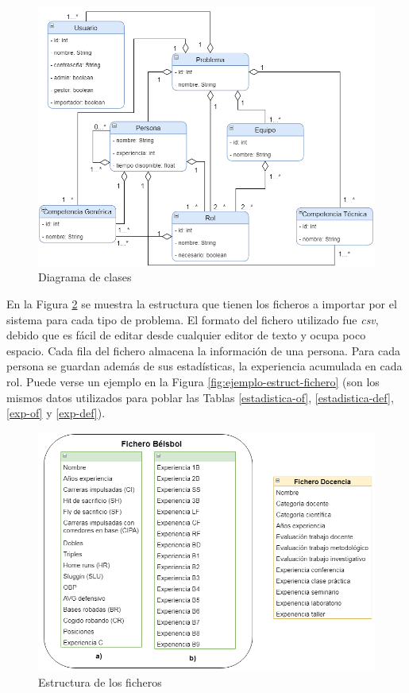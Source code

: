 \begin{figure}[H]
	\centering
	\includegraphics[width=1\textwidth]{figuras/diagramaClases.png}
	\caption{Diagrama de clases}\label{fig:diag-clases}
\end{figure}

En la Figura \ref{fig:estruct-fichero} se muestra la estructura que tienen los ficheros a importar por el sistema para cada tipo de problema. El formato del fichero utilizado fue \textit{csv}, debido que es fácil de editar desde cualquier editor de texto y ocupa poco espacio. Cada fila del fichero almacena la información de una persona. Para cada persona se guardan además de sus estadísticas, la experiencia acumulada en cada rol. Puede verse un ejemplo en la Figura \ref{fig:ejemplo-estruct-fichero} (son los mismos datos utilizados para poblar las Tablas \ref{estadistica-of}, \ref{estadistica-def}, \ref{exp-of} y \ref{exp-def}).

\begin{figure}[H]
	\centering
	\includegraphics[width=1\textwidth]{figuras/estructuraFichero.png}
	\caption{Estructura de los ficheros}\label{fig:estruct-fichero}
\end{figure}

